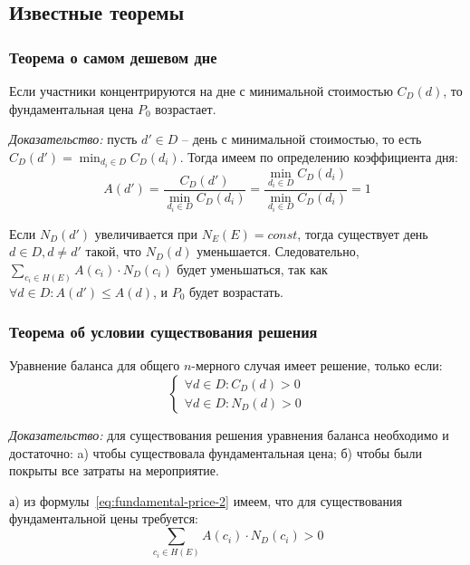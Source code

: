 \subsection{Известные теоремы}

\subsubsection{Теорема о самом дешевом дне}

Если участники концентрируются на дне с минимальной стоимостью $C_D(d)$, то фундаментальная цена $P_0$ возрастает.

\textit{Доказательство:} пусть $d' \in D$ -- день с минимальной стоимостью, то есть $C_D(d') = \min_{d_i \in D}{C_D(d_i)}$. Тогда имеем по определению коэффициента дня:
\begin{equation}
	A(d') = \frac{C_D(d')}{\min_{d_i \in D}{C_D(d_i)}} = \frac{\min_{d_i \in D}{C_D(d_i)}}{\min_{d_i \in D}{C_D(d_i)}} = 1
\end{equation}

Если $N_D(d')$ увеличивается при $N_E(E) = const$, тогда существует день \newline $d \in D, d \ne d'$ такой, что $N_D(d)$ уменьшается. Следовательно, $\sum_{c_i \in H(E)}{A(c_i) \cdot N_D(c_i)}$ будет уменьшаться, так как $\forall d \in D: A(d') \le A(d)$, и $P_0$ будет возрастать.

\subsubsection{Теорема об условии существования решения}

Уравнение баланса для общего $n$-мерного случая имеет решение, только если:
\begin{equation}
	\begin{cases}
		\forall d \in D: C_D(d) > 0 \\
		\forall d \in D: N_D(d) > 0
	\end{cases}
\end{equation}

\textit{Доказательство:} для существования решения уравнения баланса необходимо и достаточно: a) чтобы существовала фундаментальная цена; б) чтобы были покрыты все затраты на мероприятие. 

а) из формулы~\ref{eq:fundamental-price-2} имеем, что для существования фундаментальной цены требуется:
\begin{equation}
	\sum_{c_i \in H(E)}{A(c_i) \cdot N_D(c_i)} > 0
	\label{eq:exist-cond}
\end{equation}

